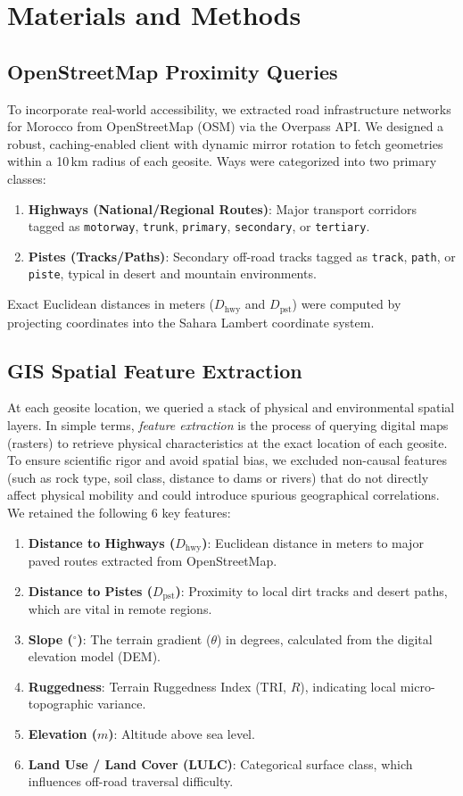 \documentclass[11pt,twocolumn,a4paper]{article}
\begin{document}
\section{Materials and Methods}

\subsection{OpenStreetMap Proximity Queries}
To incorporate real-world accessibility, we extracted road infrastructure networks for Morocco from OpenStreetMap (OSM) via the Overpass API. We designed a robust, caching-enabled client with dynamic mirror rotation to fetch geometries within a 10\,km radius of each geosite. Ways were categorized into two primary classes:
\begin{enumerate}
    \item \textbf{Highways (National/Regional Routes)}: Major transport corridors tagged as \texttt{motorway}, \texttt{trunk}, \texttt{primary}, \texttt{secondary}, or \texttt{tertiary}.
    \item \textbf{Pistes (Tracks/Paths)}: Secondary off-road tracks tagged as \texttt{track}, \texttt{path}, or \texttt{piste}, typical in desert and mountain environments.
\end{enumerate}
Exact Euclidean distances in meters ($D_{\text{hwy}}$ and $D_{\text{pst}}$) were computed by projecting coordinates into the Sahara Lambert coordinate system.

\subsection{GIS Spatial Feature Extraction}
At each geosite location, we queried a stack of physical and environmental spatial layers. In simple terms, \textit{feature extraction} is the process of querying digital maps (rasters) to retrieve physical characteristics at the exact location of each geosite. To ensure scientific rigor and avoid spatial bias, we excluded non-causal features (such as rock type, soil class, distance to dams or rivers) that do not directly affect physical mobility and could introduce spurious geographical correlations. We retained the following 6 key features:
\begin{enumerate}
    \item \textbf{Distance to Highways ($D_{\text{hwy}}$)}: Euclidean distance in meters to major paved routes extracted from OpenStreetMap.
    \item \textbf{Distance to Pistes ($D_{\text{pst}}$)}: Proximity to local dirt tracks and desert paths, which are vital in remote regions.
    \item \textbf{Slope ($^\circ$)}: The terrain gradient ($\theta$) in degrees, calculated from the digital elevation model (DEM).
    \item \textbf{Ruggedness}: Terrain Ruggedness Index (TRI, $R$), indicating local micro-topographic variance.
    \item \textbf{Elevation ($m$)}: Altitude above sea level.
    \item \textbf{Land Use / Land Cover (LULC)}: Categorical surface class, which influences off-road traversal difficulty.
\end{enumerate}
\end{document}
